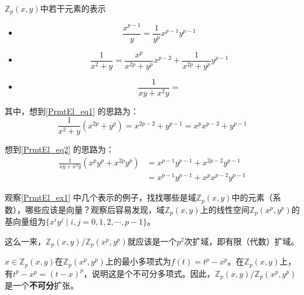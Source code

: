 \begin{example}{$\mathbb{Z}_p(x, y)$中若干元素的表示}\label{PrmtEl_ex1}


\begin{itemize}

\item 
\begin{equation}
\frac{x^{p-1}}{y} = \frac{1}{y^p}x^{p-1}y^{p-1}
\end{equation}

\item 
\begin{equation}\label{PrmtEl_eq1}
\frac{1}{x^2+y} = \frac{x^p}{x^{2p}+y^p}x^{p-2} + \frac{1}{x^{2p}+y^p}y^{p-1}
\end{equation}

\item 
\begin{equation}\label{PrmtEl_eq2}
\frac{1}{xy+x^2y} = 
\end{equation}

\end{itemize}



其中，想到\autoref{PrmtEl_eq1} 的思路为：
\begin{equation}
\frac{1}{x^2+y}(x^{2p}+y^p) = x^{2p-2}+y^{p-1} = x^px^{p-2}+y^{p-1}
\end{equation}

想到\autoref{PrmtEl_eq2} 的思路为：
\begin{equation}
\begin{aligned}
\frac{1}{xy+x^2y}(x^py^p+x^{2p}y^p) &= x^{p-1}y^{p-1}+x^{2p-2}y^{p-1} \\
&= x^{p-1}y^{p-1}+x^px^{p-2}y^{p-1}
\end{aligned}
\end{equation}

\end{example}

观察\autoref{PrmtEl_ex1} 中几个表示的例子，找找哪些是域$\mathbb{Z}_p(x, y)$中的元素（系数），哪些应该是向量？观察后容易发现，域$\mathbb{Z}_p(x, y)$上的线性空间$\mathbb{Z}_p(x^p, y^p)$的基向量组为$\{x^iy^j\mid i, j=0, 1, 2, \cdots, p-1\}$。

这么一来，$\mathbb{Z}_p(x, y)/\mathbb{Z}_p(x^p, y^p)$就应该是一个$p^2$次扩域，即有限（代数）扩域。

$x\in\mathbb{Z}_p(x, y)$在$\mathbb{Z}_p(x^p, y^p)$上的最小多项式为$f(t)=t^p-x^p$。在$\mathbb{Z}_p(x, y)$上，有$t^p-x^p=(t-x)^p$，说明这是个不可分多项式。因此，$\mathbb{Z}_p(x, y)/\mathbb{Z}_p(x^p, y^p)$是一个\textbf{不可分}扩张。

